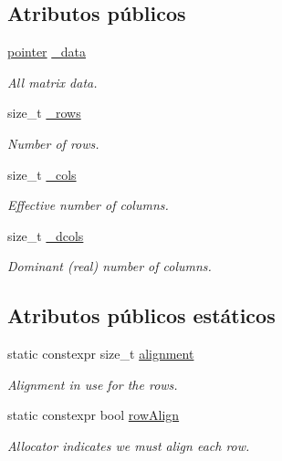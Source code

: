 \subsection*{Atributos públicos}
\begin{DoxyCompactItemize}
\item 
\hyperlink{classanpi_1_1Matrix_a6d2754ddec71081f6e1c0e4c320e8f8e}{pointer} \hyperlink{structanpi_1_1Matrix_1_1__Matrix__impl_ae23d12dd9622f7a0b608625265c60052}{\+\_\+data}
\begin{DoxyCompactList}\small\item\em All matrix data. \end{DoxyCompactList}\item 
size\+\_\+t \hyperlink{structanpi_1_1Matrix_1_1__Matrix__impl_ab46b4a556e1471d7dcafd68669124863}{\+\_\+rows}
\begin{DoxyCompactList}\small\item\em Number of rows. \end{DoxyCompactList}\item 
size\+\_\+t \hyperlink{structanpi_1_1Matrix_1_1__Matrix__impl_a0449efda7c550cf9a8329d40240237a3}{\+\_\+cols}
\begin{DoxyCompactList}\small\item\em Effective number of columns. \end{DoxyCompactList}\item 
size\+\_\+t \hyperlink{structanpi_1_1Matrix_1_1__Matrix__impl_ae39deaa80d98414407f4c567b93e535d}{\+\_\+dcols}
\begin{DoxyCompactList}\small\item\em Dominant (real) number of columns. \end{DoxyCompactList}\end{DoxyCompactItemize}
\subsection*{Atributos públicos estáticos}
\begin{DoxyCompactItemize}
\item 
static constexpr size\+\_\+t \hyperlink{structanpi_1_1Matrix_1_1__Matrix__impl_abaf34526e81f2208ca054d4b88599409}{alignment}
\begin{DoxyCompactList}\small\item\em Alignment in use for the rows. \end{DoxyCompactList}\item 
static constexpr bool \hyperlink{structanpi_1_1Matrix_1_1__Matrix__impl_ad932bc30dc20263904a41747ec51532a}{row\+Align}
\begin{DoxyCompactList}\small\item\em Allocator indicates we must align each row. \end{DoxyCompactList}\end{DoxyCompactItemize}


